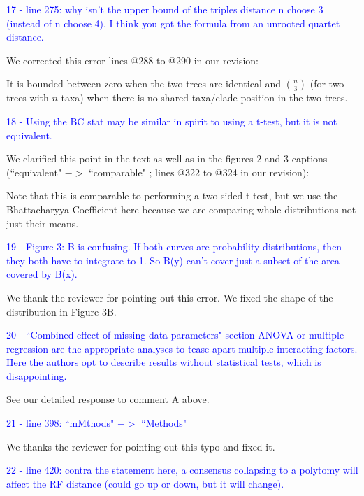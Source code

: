 \documentclass[11pt]{letter}
\begin{document}
\begin{letter}{}
\textcolor{blue}{17 - line 275: why isn't the upper bound of the triples distance n choose 3 (instead of n choose 4). I think you got the formula from an unrooted quartet distance.}

We corrected this error lines @288 to @290 in our revision:

\hfill\begin{minipage}{\dimexpr\textwidth-1cm}
It is bounded between zero when the two trees are identical and $\binom{n}{3}$ (for two trees with $n$ taxa) when there is no shared taxa/clade position in the two trees.
\end{minipage}


\textcolor{blue}{18 - Using the BC stat may be similar in spirit to using a t-test, but it is not equivalent.}

We clarified this point in the text as well as in the figures 2 and 3 captions (``equivalent" $->$ ``comparable" ; lines @322 to @324 in our revision):

\hfill\begin{minipage}{\dimexpr\textwidth-1cm}
Note that this is comparable to performing a two-sided t-test, but we use the Bhattacharyya Coefficient here because we are comparing whole distributions not just their means.
\end{minipage}


\textcolor{blue}{19 - Figure 3: B is confusing. If both curves are probability distributions, then they both have to integrate to 1. So B(y) can't cover just a subset of the area covered by B(x).}

We thank the reviewer for pointing out this error. We fixed the shape of the distribution in Figure 3B.


\textcolor{blue}{20 - ``Combined effect of missing data parameters" section ANOVA or multiple regression are the appropriate analyses to tease apart multiple interacting factors. Here the authors opt to describe results without statistical tests, which is disappointing.}

See our detailed response to comment A above.


\textcolor{blue}{21 - line 398: ``mMthods" $->$ ``Methods"}

We thanks the reviewer for pointing out this typo and fixed it.

\textcolor{blue}{22 - line 420: contra the statement here, a consensus collapsing to a polytomy will affect the RF distance (could go up or down, but it will change).}


\end{letter}
\end{document}
